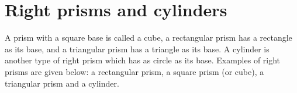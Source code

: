\section{Right prisms and cylinders }

A prism with a square base is called a cube, a rectangular prism has a rectangle as its
base, and a triangular prism has a triangle as its base. A cylinder is another type of right
prism which has as circle as its base. Examples of right prisms are given below: a rectangular prism, a square prism (or cube), a triangular prism and a cylinder.
\par 
\setcounter{subfigure}{0}

